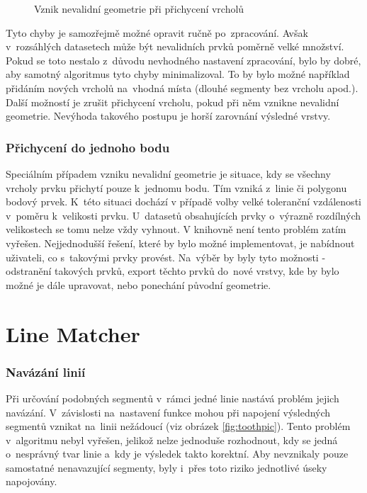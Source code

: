   \begin{figure}[H]
    \centering
      \def\svgwidth{400pt}
      
      \caption{Vznik nevalidní geometrie při přichycení vrcholů}
      \label{fig:vs-nevalidni}
  \end{figure} 

Tyto chyby je samozřejmě možné opravit ručně po~zpracování. Avšak
v~rozsáhlých datasetech může být nevalidních prvků poměrně velké množství.
Pokud se toto nestalo z~důvodu nevhodného nastavení zpracování, bylo by 
dobré, aby samotný algoritmus tyto chyby minimalizoval. To by bylo možné 
například přidáním nových vrcholů na~vhodná místa (dlouhé segmenty bez vrcholu
apod.). Další možností je zrušit přichycení vrcholu, pokud při něm vznikne
nevalidní geometrie. Nevýhoda takového postupu je horší zarovnání výsledné 
vrstvy. 

\subsubsection{Přichycení do jednoho bodu}
Speciálním případem vzniku nevalidní geometrie je situace, kdy se všechny 
vrcholy prvku přichytí pouze k~jednomu bodu. Tím vzniká z~linie či polygonu
bodový prvek. K~této situaci dochází v případě volby velké toleranční 
vzdálenosti v~poměru k~velikosti prvku. U~datasetů obsahujících prvky
o~výrazně rozdílných velikostech se tomu nelze vždy vyhnout. V knihovně
 není tento problém zatím vyřešen. Nejjednodušší řešení, které
by bylo možné implementovat, je nabídnout uživateli, co s~takovými prvky provést.
Na~výběr by byly tyto možnosti - odstranění takových prvků, export těchto prvků 
do~nové vrstvy, kde by bylo možné je dále upravovat, nebo ponechání původní 
geometrie.


\section{Line Matcher}
\label{problemy-lm}

\subsubsection{Navázání linií}
Při určování podobných segmentů v~rámci jedné linie nastává problém jejich
navá\-zání. V~závislosti na~nastavení funkce mohou při napojení výsledných
segmentů vznikat na~linii nežádoucí  (viz obrázek \ref{fig:toothpic}).
Tento problém v~algoritmu nebyl vyřešen, jelikož nelze jednoduše rozhodnout, 
kdy se jedná o~nesprávný tvar linie a~kdy je výsledek takto korektní.
Aby nevznikaly pouze samostatné nenavazující segmenty, byly i~přes toto
riziko jednotlivé úseky napojovány.


